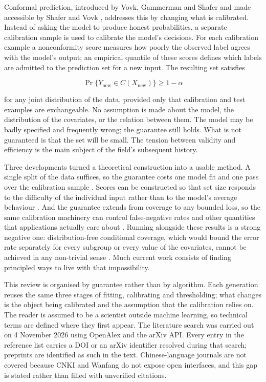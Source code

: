 Conformal prediction, introduced by Vovk, Gammerman and Shafer \cite{Vovk2005} and
made accessible by Shafer and Vovk \cite{Shafer2008}, addresses this by changing
what is calibrated. Instead of asking the model to produce honest probabilities, a
separate calibration sample is used to calibrate the model's decisions. For each
calibration example a nonconformity score measures how poorly the observed label
agrees with the model's output; an empirical quantile of these scores defines which
labels are admitted to the prediction set for a new input. The resulting set
satisfies

\begin{equation}
\Pr\{Y_{\text{new}} \in C(X_{\text{new}})\} \geq 1-\alpha
\end{equation}

for any joint distribution of the data, provided only that calibration and test
examples are exchangeable. No assumption is made about the model, the distribution
of the covariates, or the relation between them. The model may be badly specified
and frequently wrong; the guarantee still holds. What is not guaranteed is that the
set will be small. The tension between validity and efficiency is the main subject
of the field's subsequent history.

Three developments turned a theoretical construction into a usable method. A
single split of the data suffices, so the guarantee costs one model fit and one
pass over the calibration sample \cite{Lei2018}. Scores can be constructed so that
set size responds to the difficulty of the individual input rather than to the
model's average behaviour \cite{Romano2020,RAPS}. And the guarantee
extends from coverage to any bounded loss, so the same calibration machinery can
control false-negative rates and other quantities that applications actually care
about \cite{Bates2021,LTT}. Running alongside these results is a strong
negative one: distribution-free conditional coverage, which would bound the error
rate separately for every subgroup or every value of the covariates, cannot be
achieved in any non-trivial sense \cite{Barber2021}. Much current work consists of
finding principled ways to live with that impossibility.

This review is organised by guarantee rather than by algorithm. Each generation
reuses the same three stages of fitting, calibrating and thresholding; what changes
is the object being calibrated and the assumption that the calibration relies on.
The reader is assumed to be a scientist outside machine learning, so technical
terms are defined where they first appear. The literature search was carried out on
4 November 2026 using OpenAlex and the arXiv API. Every entry in the reference list
carries a DOI or an arXiv identifier resolved during that search; preprints are
identified as such in the text. Chinese-language journals are not covered because
CNKI and Wanfang do not expose open interfaces, and this gap is stated rather than
filled with unverified citations.

